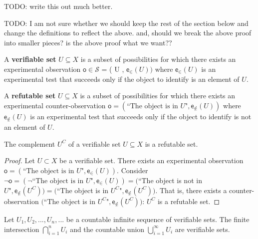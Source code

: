 \documentclass[11pt,letterpaper,fleqn]{memoir} %
\begin{document}
TODO: write this out much better. 

















TODO: I am not sure whether we should keep the rest of the section below and change the definitions to reflect the above. and, should we break the above proof into smaller pieces? is the above proof what we want??



\begin{defn}
	A \textbf{verifiable set} $U \subseteq X$ is a subset of possibilities for which there exists an experimental observation $\mathsf{o}\in\mathcal{S}$  = ( U , $\mathsf{e}_\in(U))$ where $\mathsf{e}_\in(U)$ is an experimental test that succeeds only if the object to identify is an element of $U$.
\end{defn}

\begin{defn}
	A \textbf{refutable set} $U \subseteq X$ is a subset of possibilities for which there exists an experimental counter-observation $\mathsf{o} = (\text{``The object is in } U \text{"}, \mathsf{e}_{\notin}(U))$ where $\mathsf{e}_{\notin}(U)$ is an experimental test that succeeds only if the object to identify is not an element of $U$.
\end{defn}

\begin{prop}
	The complement $U^C$ of a verifiable set $U \subseteq X$ is a refutable set.
\end{prop}

\begin{proof}
	Let $U\subset X$ be a verifiable set. There exists an experimental observation $\mathsf{o} = (\text{``The object is in } U \text{"}, \mathsf{e}_\in(U))$. Consider $\neg \mathsf{o} = (\neg \text{``The object is in } U \text{"}, \mathsf{e}_\in(U)) = ($``The object  is not in $ U \text{"}, \mathsf{e}_{\notin}(U^C)) = ($``The object  is in $ U^C \text{"}, \mathsf{e}_{\notin}(U^C))$. That is, there exists a counter-observation $($``The object  is in $ U^C \text{"}, \mathsf{e}_{\notin}(U^C))$: $U^C$ is a refutable set.
\end{proof}

\begin{prop}
	Let $U_1, U_2, ... , U_n, ...$ be a countable infinite sequence of verifiable sets. The finite intersection $\bigcap\limits_{i=1}^{n} U_i$ and the countable union  $\bigcup\limits_{i=1}^{\infty} U_i$ are verifiable sets.
\end{prop}
\end{document}
